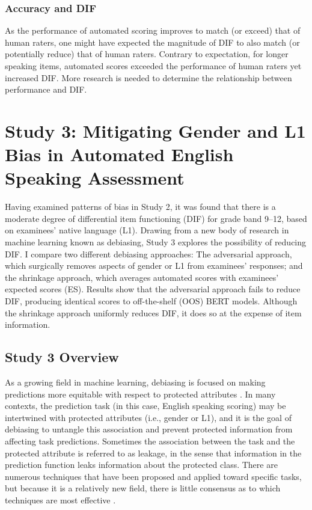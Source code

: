\documentclass [PhD] {uclathes}
\begin{document}
\subsection{Accuracy and DIF}

As the performance of automated scoring improves to match (or exceed) that of human raters, one might have expected the magnitude of DIF to also match (or potentially reduce) that of human raters. Contrary to expectation, for longer speaking items, automated scores exceeded the performance of human raters yet increased DIF. More research is needed to determine the relationship between performance and DIF. 



\chapter{Study 3: Mitigating Gender and L1 Bias in Automated English Speaking Assessment}

Having examined patterns of bias in Study 2, it was found that there is a moderate degree of differential item functioning (DIF) for grade band 9–12, based on examinees’ native language (L1). Drawing from a new body of research in machine learning known as debiasing, Study 3 explores the possibility of reducing DIF. I compare two different debiasing approaches: The adversarial approach, which surgically removes aspects of gender or L1 from examinees’ responses; and the shrinkage approach, which averages automated scores with examinees’ expected scores (ES). Results show that the adversarial approach fails to reduce DIF, producing identical scores to off-the-shelf (OOS) BERT models. Although the shrinkage approach uniformly reduces DIF, it does so at the expense of item information. 

\section{Study 3 Overview}

As a growing field in machine learning, debiasing is focused on making predictions more equitable with respect to protected attributes \citep{elazar2018adversarial}. In many contexts, the prediction task (in this case, English speaking scoring) may be intertwined with protected attributes (i.e., gender or L1), and it is the goal of debiasing to untangle this association and prevent protected information from affecting task predictions. Sometimes the association between the task and the protected attribute is referred to as leakage, in the sense that information in the prediction function leaks information about the protected class. There are numerous techniques that have been proposed and applied toward specific tasks, but because it is a relatively new field, there is little consensus as to which techniques are most effective \citep{sun2019mitigating}. 
\end{document}
